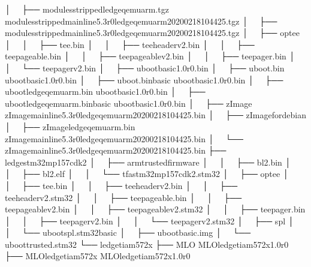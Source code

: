 \documentclass[a4paper,10pt,oneside,english]{sphinxmanual}
\begin{document}
\begin{sphinxVerbatim}[commandchars=\\\{\}]
│   ├── modules\PYGZhy{}stripped\PYGZhy{}ledge\PYGZhy{}qemuarm.tgz \PYGZhy{}\PYGZgt{} modules\PYGZhy{}stripped\PYGZhy{}\PYGZhy{}mainline\PYGZhy{}5.3\PYGZhy{}r0\PYGZhy{}ledge\PYGZhy{}qemuarm\PYGZhy{}20200218104425.tgz
│   ├── modules\PYGZhy{}stripped\PYGZhy{}\PYGZhy{}mainline\PYGZhy{}5.3\PYGZhy{}r0\PYGZhy{}ledge\PYGZhy{}qemuarm\PYGZhy{}20200218104425.tgz
│   ├── optee
│   │   ├── tee.bin
│   │   ├── tee\PYGZhy{}header\PYGZus{}v2.bin
│   │   ├── tee\PYGZhy{}pageable.bin
│   │   ├── tee\PYGZhy{}pageable\PYGZus{}v2.bin
│   │   ├── tee\PYGZhy{}pager.bin
│   │   └── tee\PYGZhy{}pager\PYGZus{}v2.bin
│   ├── u\PYGZhy{}boot\PYGZhy{}basic\PYGZhy{}1.0\PYGZhy{}r0.bin
│   ├── u\PYGZhy{}boot.bin \PYGZhy{}\PYGZgt{} u\PYGZhy{}boot\PYGZhy{}basic\PYGZhy{}1.0\PYGZhy{}r0.bin
│   ├── u\PYGZhy{}boot.bin\PYGZhy{}basic \PYGZhy{}\PYGZgt{} u\PYGZhy{}boot\PYGZhy{}basic\PYGZhy{}1.0\PYGZhy{}r0.bin
│   ├── u\PYGZhy{}boot\PYGZhy{}ledge\PYGZhy{}qemuarm.bin \PYGZhy{}\PYGZgt{} u\PYGZhy{}boot\PYGZhy{}basic\PYGZhy{}1.0\PYGZhy{}r0.bin
│   ├── u\PYGZhy{}boot\PYGZhy{}ledge\PYGZhy{}qemuarm.bin\PYGZhy{}basic \PYGZhy{}\PYGZgt{} u\PYGZhy{}boot\PYGZhy{}basic\PYGZhy{}1.0\PYGZhy{}r0.bin
│   ├── zImage \PYGZhy{}\PYGZgt{} zImage\PYGZhy{}\PYGZhy{}mainline\PYGZhy{}5.3\PYGZhy{}r0\PYGZhy{}ledge\PYGZhy{}qemuarm\PYGZhy{}20200218104425.bin
│   ├── zImage\PYGZhy{}for\PYGZhy{}debian
│   ├── zImage\PYGZhy{}ledge\PYGZhy{}qemuarm.bin \PYGZhy{}\PYGZgt{} zImage\PYGZhy{}\PYGZhy{}mainline\PYGZhy{}5.3\PYGZhy{}r0\PYGZhy{}ledge\PYGZhy{}qemuarm\PYGZhy{}20200218104425.bin
│   └── zImage\PYGZhy{}\PYGZhy{}mainline\PYGZhy{}5.3\PYGZhy{}r0\PYGZhy{}ledge\PYGZhy{}qemuarm\PYGZhy{}20200218104425.bin
├── ledge\PYGZhy{}stm32mp157c\PYGZhy{}dk2
│   ├── arm\PYGZhy{}trusted\PYGZhy{}firmware
│   │   ├── bl2.bin
│   │   ├── bl2.elf
│   │   └── tf\PYGZhy{}a\PYGZhy{}stm32mp157c\PYGZhy{}dk2.stm32
│   ├── optee
│   │   ├── tee.bin
│   │   ├── tee\PYGZhy{}header\PYGZus{}v2.bin
│   │   ├── tee\PYGZhy{}header\PYGZus{}v2.stm32
│   │   ├── tee\PYGZhy{}pageable.bin
│   │   ├── tee\PYGZhy{}pageable\PYGZus{}v2.bin
│   │   ├── tee\PYGZhy{}pageable\PYGZus{}v2.stm32
│   │   ├── tee\PYGZhy{}pager.bin
│   │   ├── tee\PYGZhy{}pager\PYGZus{}v2.bin
│   │   └── tee\PYGZhy{}pager\PYGZus{}v2.stm32
│   ├── spl
│   │   └── u\PYGZhy{}boot\PYGZhy{}spl.stm32\PYGZhy{}basic
│   ├── u\PYGZhy{}boot\PYGZhy{}basic.img
│   └── u\PYGZhy{}boot\PYGZhy{}trusted.stm32
└── ledge\PYGZhy{}ti\PYGZhy{}am572x
    ├── MLO \PYGZhy{}\PYGZgt{} MLO\PYGZhy{}ledge\PYGZhy{}ti\PYGZhy{}am572x\PYGZhy{}1.0\PYGZhy{}r0
    ├── MLO\PYGZhy{}ledge\PYGZhy{}ti\PYGZhy{}am572x \PYGZhy{}\PYGZgt{} MLO\PYGZhy{}ledge\PYGZhy{}ti\PYGZhy{}am572x\PYGZhy{}1.0\PYGZhy{}r0

\end{sphinxVerbatim}
\end{document}
